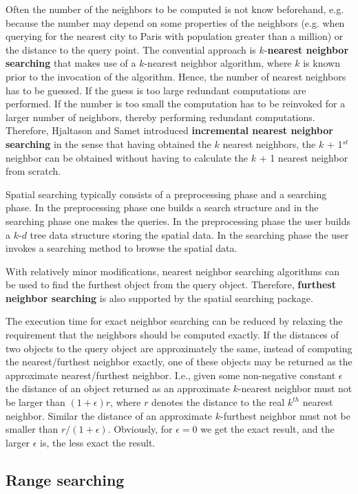 Often the number of the neighbors to be computed is not know beforehand, e.g. because the number
may depend on some properties of the neighbors  
(e.g. when querying for the nearest city to Paris with
population greater than a million) or the distance to the query point.
The convential approach is $k$-{\bf nearest neighbor searching} that makes use of a $k$-nearest neighbor
algorithm, where $k$ is known prior to the invocation of the algorithm.
Hence, the number of nearest neighbors has to be
guessed. If the guess is too large redundant computations are performed.
If the number is too small the computation has to be  
reinvoked for a larger number of neighbors, thereby performing redundant computations.
Therefore, Hjaltason and Samet \cite{hs-rsd-95} introduced {\bf incremental nearest neighbor searching} in the sense that having obtained
the $k$ nearest neighbors, the $k$ + 1$^{st}$ neighbor can be obtained without
having to calculate the $k$ + 1 nearest neighbor from scratch.
 

Spatial searching typically consists of a preprocessing phase and a searching phase. 
In the preprocessing phase one builds a search structure 
and in the searching phase 
one makes the queries. 
In the preprocessing phase the user builds a $k$-$d$ tree data structure storing the spatial data.
In the searching phase the user invokes a searching method to browse the spatial data.

With relatively minor modifications, nearest neighbor searching algorithms can be
used to find the furthest object from the query object. 
Therefore, {\bf furthest neighbor searching} is also supported
by the spatial searching package.

The execution time for exact neighbor searching can be reduced by relaxing
the requirement that the neighbors should be computed exactly.
If the distances of two objects to the query object are approximately the same,
instead of computing the nearest/furthest neighbor exactly, one of these objects may
be returned as the approximate nearest/furthest neighbor. I.e., given some non-negative constant
$\epsilon$ the distance of an object returned as an approximate $k$-nearest neighbor
must not be larger than $(1+\epsilon)r$, where
$r$ denotes the distance to the real $k^{th}$ nearest neighbor.
Similar the distance of an approximate $k$-furthest neighbor must not be smaller than $r/(1+\epsilon)$. 
Obviously, for $\epsilon=0$ we get the exact result, and the larger $\epsilon$ is, the less exact the result.

\subsection{Range searching}


